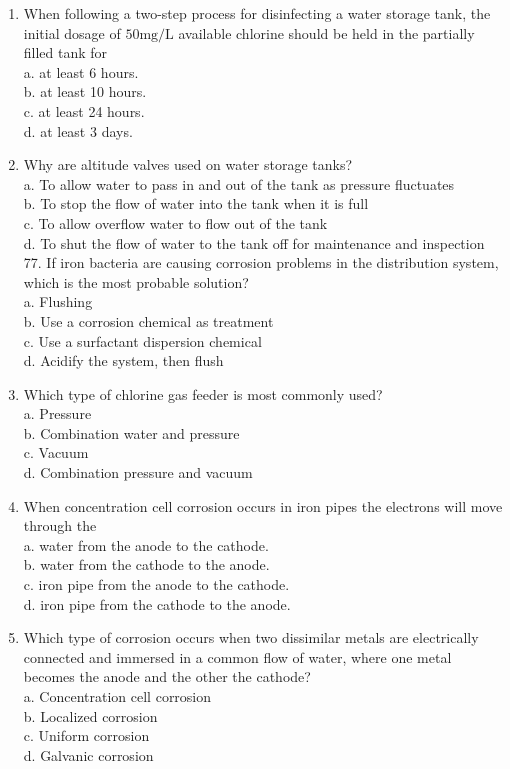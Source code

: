\documentclass[10pt]{article}
\begin{document}
\begin{enumerate}
  \item When following a two-step process for disinfecting a water storage tank, the initial dosage of $50 \mathrm{mg} / \mathrm{L}$ available chlorine should be held in the partially filled tank for\\
a. at least 6 hours.\\
b. at least 10 hours.\\
c. at least 24 hours.\\
d. at least 3 days.

  \item Why are altitude valves used on water storage tanks?\\
a. To allow water to pass in and out of the tank as pressure fluctuates\\
b. To stop the flow of water into the tank when it is full\\
c. To allow overflow water to flow out of the tank\\
d. To shut the flow of water to the tank off for maintenance and inspection 77. If iron bacteria are causing corrosion problems in the distribution system, which is the most probable solution?\\
a. Flushing\\
b. Use a corrosion chemical as treatment\\
c. Use a surfactant dispersion chemical\\
d. Acidify the system, then flush

  \item Which type of chlorine gas feeder is most commonly used?\\
a. Pressure\\
b. Combination water and pressure\\
c. Vacuum\\
d. Combination pressure and vacuum

  \item When concentration cell corrosion occurs in iron pipes the electrons will move through the\\
a. water from the anode to the cathode.\\
b. water from the cathode to the anode.\\
c. iron pipe from the anode to the cathode.\\
d. iron pipe from the cathode to the anode.

  \item Which type of corrosion occurs when two dissimilar metals are electrically connected and immersed in a common flow of water, where one metal becomes the anode and the other the cathode?\\
a. Concentration cell corrosion\\
b. Localized corrosion\\
c. Uniform corrosion\\
d. Galvanic corrosion


\end{enumerate}
\end{document}
